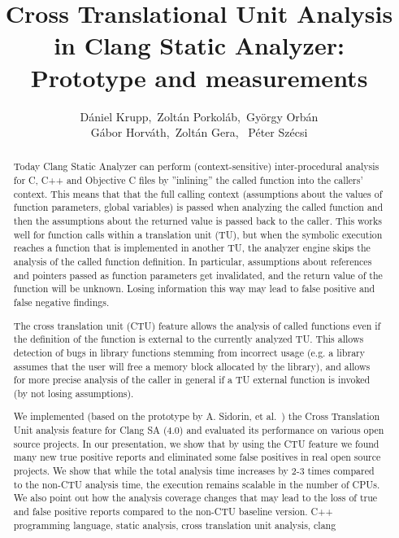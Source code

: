 \documentclass{article}
\title{Cross Translational Unit Analysis in Clang Static Analyzer: Prototype and measurements}
\author{D\'aniel Krupp\inst1,\ Zolt\'an Porkol\'ab\inst1,\ Gy\"orgy Orb\'an\inst1\\
        G\'abor Horv\'ath\inst2,\ Zolt\'an Gera\inst2, \ P\' eter Sz\' ecsi\inst2}
\institute{\inst1Ericsson Ltd., \inst2E\"{o}tv\"{o}s Lor\'{a}nd University, Faculty of Informatics\\
             \inst1\url{daniel.krupp@ericsson.com}, 
             \inst1\url{zoltan.porkolab@ericsson.com},
             \inst1\url{gyorgy.orban@ericsson.com},
             \inst2\url{xazax@caesar.elte.hu}, 
             \inst2\url{gerazo@caesar.elte.hu},
             \inst2\url{szepet95@gmail.com},
             
             }
\begin{document}
\maketitle


\begin{abstract}
Today Clang Static Analyzer \cite{clangsa} can perform (context-sensitive) inter-procedural analysis for 
C, C++ and Objective C files by ''inlining'' 
the called function into the callers' context. This means that that the full 
calling context
(assumptions about the values of function parameters, global variables) is passed when 
analyzing the called function and
then the assumptions about the returned value is passed back to the caller. 
This works well for function calls within a
translation unit (TU), but when the symbolic execution reaches a function that 
is implemented in another TU, the analyzer engine 
skips the analysis of the called function definition. In particular,
assumptions about references and pointers passed as function 
parameters get invalidated, and the return value of the function will be unknown.
Losing information this way may lead to false positive
and false negative findings.

The cross translation unit (CTU) feature allows the analysis of called 
functions even if the definition of the function is external to the currently 
analyzed TU. This allows detection of bugs in library functions stemming
from incorrect usage (e.g. a library assumes that the user will free a memory 
block allocated by the library), and allows for more precise analysis
of the caller in general if a TU external function is invoked
(by not losing assumptions).

We implemented (based on the prototype by A. Sidorin, et al.~\cite{artemctu})
the Cross Translation Unit analysis feature for Clang SA (4.0) and evaluated 
its performance on various open source projects. In our presentation, we show 
that by using the CTU feature we found many new true positive reports and 
eliminated some false positives in real open source projects. We show that 
while the total analysis time increases by 2-3 times compared to 
the non-CTU analysis time, the execution remains scalable in the number of CPUs. 
We also point out how the analysis
coverage changes that may lead to the loss of true and false positive reports 
compared to the non-CTU baseline version.
\keywords C++ programming language, static analysis, cross translation unit analysis, clang
\end{abstract}
\end{document}
